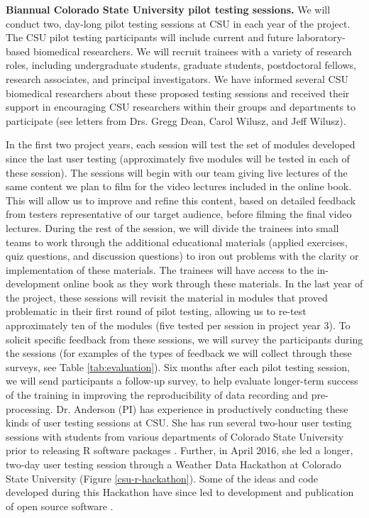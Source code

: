 \documentclass[pdftex,english,11pt,parskip=half]{scrartcl}
\begin{document}


\textbf{Biannual Colorado State University pilot testing sessions.}
We will conduct two, day-long pilot testing sessions at CSU in each year of the
project. The CSU pilot testing participants will include current and future
laboratory-based biomedical researchers. We will recruit trainees with a variety
of research roles, including undergraduate students, graduate students,
postdoctoral fellows, research associates, and principal investigators. We have
informed several CSU biomedical researchers about these proposed testing
sessions and received their support in encouraging CSU researchers within their
groups and departments to participate (see letters from Drs. Gregg Dean, Carol Wilusz, and Jeff Wilusz). 

In the first two project years, each session will test the set of modules
developed since the last user testing (approximately five modules will be tested
in each of these session). The sessions will begin with our team giving live
lectures of the same content we plan to film for the video lectures included in
the online book. This will allow us to improve and refine this content, based on
detailed feedback from testers representative of our target audience, before
filming the final video lectures. During the rest of the session, we will divide
the trainees into small teams to work through the additional educational
materials (applied exercises, quiz questions, and discussion questions) to iron
out problems with the clarity or implementation of these materials. The trainees
will have access to the in-development online book as they work through these
materials. In the last year of the project, these sessions will revisit the material
in modules that proved problematic in their first round of pilot testing, allowing us
to re-test approximately ten of the modules (five tested per session in project year 3).
To solicit specific feedback from these sessions, we will survey the participants during the sessions (for examples of the types of feedback we will collect through these surveys, see Table \ref{tab:evaluation}). Six months after each pilot testing session, we will send participants a follow-up survey, to help evaluate longer-term success of the training in improving the reproducibility of data recording and pre-processing. Dr. Anderson (PI) has experience in productively conducting these kinds of user
testing sessions at CSU. She has run several two-hour user testing sessions with
students from various departments of Colorado State University prior to
releasing R software packages \cite{futureheatwaves, countyweather}. Further, in
April 2016, she led a longer, two-day user testing session through a Weather
Data Hackathon at Colorado State University (Figure \ref{csu-r-hackathon}).
Some of the ideas and code developed during this Hackathon have
since led to development and publication of open source software
\cite{countyfloods, noaastormevents}.
\end{document}
